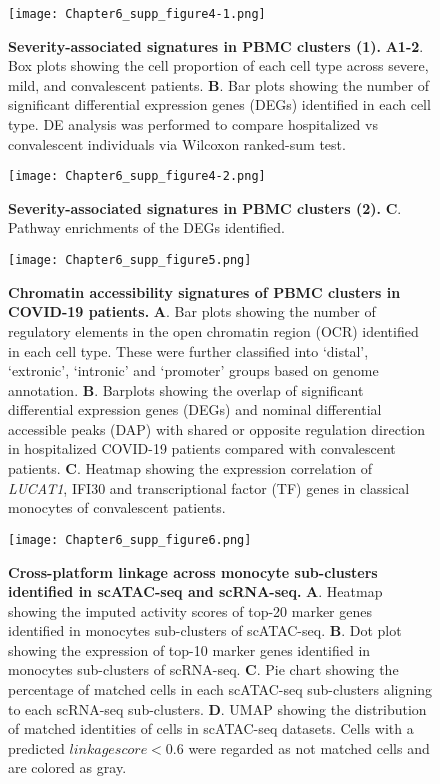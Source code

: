 \documentclass{book}
\begin{document}
\begin{refsection}
\begin{figure}[!ht]
  \centering
  \texttt{[image: Chapter6\_supp\_figure4-1.png]}
  \caption{\label{fig:chp6supfig4}
    \textbf{Severity-associated signatures in PBMC clusters (1).}
    \textbf{A1-2}. Box plots showing the cell proportion of each cell type across severe, mild, and convalescent patients.
    \textbf{B}. Bar plots showing the number of significant differential expression genes (DEGs) identified in each cell type. DE analysis was performed to compare hospitalized vs convalescent individuals via Wilcoxon ranked-sum test.
}
\end{figure}
\begin{figure}[!ht]
  \addtocounter{figure}{-1}
  \centering
  \texttt{[image: Chapter6\_supp\_figure4-2.png]}
  \caption{
    \textbf{Severity-associated signatures in PBMC clusters (2).}
    \textbf{C}. Pathway enrichments of the DEGs identified.
}
\end{figure}

\begin{figure}[!ht]
  \centering
  \texttt{[image: Chapter6\_supp\_figure5.png]}
  \caption{\label{fig:chp6supfig5}
    \textbf{Chromatin accessibility signatures of PBMC clusters in COVID-19 patients.}
    \textbf{A}. Bar plots showing the number of regulatory elements in the open chromatin region (OCR) identified in each cell type. These were further classified into ‘distal’, ‘extronic’, ‘intronic’ and ‘promoter’ groups based on genome annotation.
    \textbf{B}. Barplots showing the overlap of significant differential expression genes (DEGs) and nominal differential accessible peaks (DAP) with shared or opposite regulation direction in hospitalized COVID-19 patients compared with convalescent patients.
    \textbf{C}. Heatmap showing the expression correlation of \textit{LUCAT1}, IFI30 and transcriptional factor (TF) genes in classical monocytes of convalescent patients.
}
\end{figure}

\begin{figure}[!ht]
  \centering
  \texttt{[image: Chapter6\_supp\_figure6.png]}
  \caption{\label{fig:chp6supfig6}
    \textbf{Cross-platform linkage across monocyte sub-clusters identified in scATAC-seq and scRNA-seq.}
    \textbf{A}. Heatmap showing the imputed activity scores of top-20 marker genes identified in monocytes sub-clusters of scATAC-seq.
    \textbf{B}. Dot plot showing the expression of top-10 marker genes identified in monocytes sub-clusters of scRNA-seq.
    \textbf{C}. Pie chart showing the percentage of matched cells in each scATAC-seq sub-clusters aligning to each scRNA-seq sub-clusters.
    \textbf{D}. UMAP showing the distribution of matched identities of cells in scATAC-seq datasets. Cells with a predicted $linkage score < 0.6$ were regarded as not matched cells and are colored as gray.
}
\end{figure}


\end{refsection}
\end{document}
